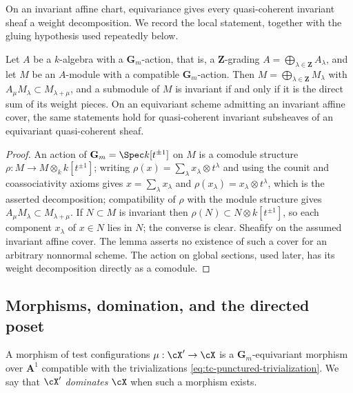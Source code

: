 On an invariant affine chart, equivariance gives every quasi-coherent
invariant sheaf a weight decomposition.  We record the local statement,
together with the gluing hypothesis used repeatedly below.

\begin{lemma}
\label{lem:ch33-weight-decomposition}
Let $A$ be a $k$-algebra with a $\mathbf G_m$-action, that is, a
$\mathbf Z$-grading $A=\bigoplus_{\lambda\in\mathbf Z}A_\lambda$, and
let $M$ be an $A$-module with a compatible $\mathbf G_m$-action.
Then $M=\bigoplus_{\lambda\in\mathbf Z}M_\lambda$ with
$A_\mu M_\lambda\subset M_{\lambda+\mu}$, and a submodule of $M$ is
invariant if and only if it is the direct sum of its weight pieces.  On an
equivariant scheme admitting an invariant affine cover, the same statements
hold for quasi-coherent invariant subsheaves of an equivariant
quasi-coherent sheaf.
\end{lemma}

\begin{proof}
An action of $\mathbf G_m=\Spec k[t^{\pm1}]$ on $M$ is a comodule
structure $\rho:M\to M\otimes_kk[t^{\pm1}]$; writing
$\rho(x)=\sum_\lambda x_\lambda\otimes t^\lambda$ and using the counit and
coassociativity axioms gives $x=\sum_\lambda x_\lambda$ and
$\rho(x_\lambda)=x_\lambda\otimes t^\lambda$, which is the asserted
decomposition; compatibility of $\rho$ with the module structure gives
$A_\mu M_\lambda\subset M_{\lambda+\mu}$.  If $N\subset M$ is invariant
then $\rho(N)\subset N\otimes k[t^{\pm1}]$, so each component
$x_\lambda$ of $x\in N$ lies in $N$; the converse is clear.  Sheafify
on the assumed invariant affine cover.  The lemma asserts no existence
of such a cover for an arbitrary nonnormal scheme.  The action on global
sections, used later, has its weight decomposition directly as a comodule.
\end{proof}

\subsection{Morphisms, domination, and the directed poset}
\label{sec:ch33-domination}

A morphism of test configurations $\mu:\cX'\to\cX$ is a
$\mathbf G_m$-equivariant morphism over $\mathbf A^1$ compatible with
the trivializations \eqref{eq:tc-punctured-trivialization}.  We say that
$\cX'$ \emph{dominates} $\cX$ when such a morphism exists.

